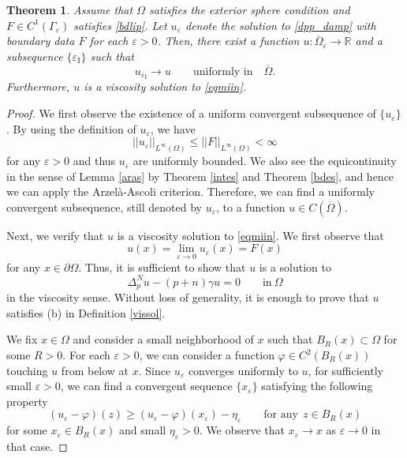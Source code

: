 \documentclass[10pt,a4paper]{amsart}
\newtheorem{theorem}{Theorem}
\newcommand{\eps}{\varepsilon}
\begin{document}
\begin{theorem}\label{conv}Assume that $\Omega$ satisfies the exterior sphere condition and  $ F \in C^1(\Gamma_{\eps}) $
satisfies \eqref{bdlip}.
Let $u_{\eps}$ denote the solution to \eqref{dpp_damp} with boundary data $ F  $ for each $\eps>0$.
Then, there exist a function $ u: \overline{\Omega}_{\eps} \to \mathbb{R}$ and a subsequence 
$ \{ \eps_{\textrm{I}} \} $ such that 
$$ u_{\eps_{\textrm{I}}} \to u \qquad \textrm{uniformly in} \quad \overline{\Omega}.$$
Furthermore, $u$ is a viscosity solution to \eqref{eqmiin}.
\end{theorem}

\begin{proof}
We first observe the existence of a uniform convergent subsequence of $\{u_{\eps}\}$.
By using the definition of $u_{\eps} $, we have
 $$||u_{\eps} ||_{L^{\infty}(\Omega)} \le ||F||_{L^{\infty}(\Omega)} < \infty $$
for any $\eps > 0$ and thus $u_{\eps} $ are uniformly bounded. 
We also see the equicontinuity in the sense of Lemma \ref{aras} by Theorem \ref{intes} and Theorem \ref{bdes},
and hence we can apply the Arzel\`{a}-Ascoli criterion.
Therefore, we can find a uniformly convergent subsequence, still denoted by $u_{\eps}$, to a function $u \in C(\overline{\Omega})$.

Next, we verify that $u$ is a viscosity solution to \eqref{eqmiin}.
We first observe that
$$ u(x) = \lim_{\eps \to 0}u_{\eps}(x) = F(x)$$
for any $x \in \partial\Omega$.
Thus, it is sufficient to show that $u$ is a solution to 
$$\Delta_{p}^{N} u-(p+n)\gamma u=0   \qquad \textrm{in} \ \Omega$$
in the viscosity sense.
Without loss of generality, it is enough to prove that $u$ satisfies (b) in Definition \ref{vissol}. 

We fix $x \in \Omega$ and consider a small neighborhood of $x$ such that 
$ B_{R}(x)  \subset \Omega $ for some $R>0$.
For each $\eps>0$, we can consider a function $\varphi \in C^{2}(B_{R}(x))$ touching $u$ from below at $x$.
Since $u_{\eps}$ converges uniformly to $u$, for sufficiently small $\eps >0$, we can find a convergent sequence $\{x_{\eps}\}$
satisfying the following property 
$$ (u_{\eps}-\varphi)(z) \ge (u_{\eps}-\varphi)(x_{\eps})-\eta_{\eps} \qquad\textrm{for any} \ \ z\in B_{R}(x) $$
for some $x_{\eps}\in B_{R}(x)$ and small $\eta_{\eps}>0$. 
We observe that $x_{\eps} \to x$ as $ \eps \to 0$ in that case.


\end{proof}
\end{document}
